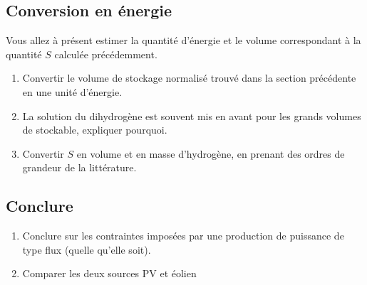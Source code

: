 \documentclass[12pt,french]{article}
\begin{document}
%


\subsection{Conversion en énergie}

Vous allez à présent estimer la quantité d'énergie et le volume correspondant à la quantité $S$ calculée précédemment. 

\begin{enumerate}
	\item Convertir le volume de stockage normalisé trouvé dans la section précédente en une unité d'énergie.
	\item La solution du dihydrogène est souvent mis en avant pour les grands volumes de stockable, expliquer pourquoi.
	\item Convertir $S$ en volume et en masse d'hydrogène, en prenant des ordres de grandeur de la littérature.
\end{enumerate}


\subsection{Conclure}
\begin{enumerate}
	\item Conclure sur les contraintes imposées par une production de puissance de type flux (quelle qu'elle soit). 
	
	\item Comparer les deux  sources PV et éolien
\end{enumerate}
\end{document}
